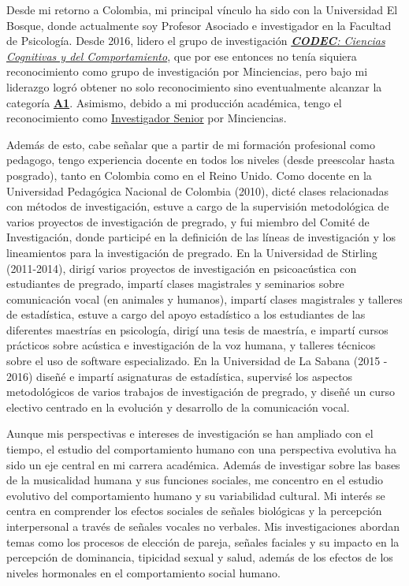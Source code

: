 \documentclass[11pt,a4paper,]{awesome-cv}
\begin{document}
\begin{small}
Desde mi retorno a Colombia, mi principal vínculo ha sido con la Universidad El Bosque, donde actualmente soy Profesor Asociado e investigador en la Facultad de Psicología. Desde 2016, lidero el grupo de investigación \href{https://investigaciones.unbosque.edu.co/codec}{\textit{\textbf{CODEC}: Ciencias Cognitivas y del Comportamiento}}, que por ese entonces no tenía siquiera reconocimiento como grupo de investigación por Minciencias, pero bajo mi liderazgo logró obtener no solo reconocimiento sino eventualmente alcanzar la categoría \textbf{\href{https://scienti.minciencias.gov.co/gruplac/jsp/visualiza/visualizagr.jsp?nro=00000000001446}{A1}}. Asimismo, debido a mi producción académica, tengo el reconocimiento como \href{https://scienti.minciencias.gov.co/cvlac/visualizador/generarCurriculoCv.do?cod_rh=0001348945}{Investigador Senior} por Minciencias.

Además de esto, cabe señalar que a partir de mi formación profesional como pedagogo, tengo experiencia docente en todos los niveles (desde preescolar hasta posgrado), tanto en Colombia como en el Reino Unido. Como docente en la Universidad Pedagógica Nacional de Colombia (2010), dicté clases relacionadas con métodos de investigación, estuve a cargo de la supervisión metodológica de varios proyectos de investigación de pregrado, y fui miembro del Comité de Investigación, donde participé en la definición de las líneas de investigación y los lineamientos para la investigación de pregrado. En la Universidad de Stirling (2011-2014), dirigí varios proyectos de investigación en psicoacústica con estudiantes de pregrado, impartí clases magistrales y seminarios sobre comunicación vocal (en animales y humanos), impartí clases magistrales y talleres de estadística, estuve a cargo del apoyo estadístico a los estudiantes de las diferentes maestrías en psicología, dirigí una tesis de maestría, e impartí cursos prácticos sobre acústica e investigación de la voz humana, y talleres técnicos sobre el uso de software especializado. En la Universidad de La Sabana (2015 - 2016) diseñé e impartí asignaturas de estadística, supervisé los aspectos metodológicos de varios trabajos de investigación de pregrado, y diseñé un curso electivo centrado en la evolución y desarrollo de la comunicación vocal.

Aunque mis perspectivas e intereses de investigación se han ampliado con el tiempo, el estudio del comportamiento humano con una perspectiva evolutiva ha sido un eje central en mi carrera académica. Además de investigar sobre las bases de la musicalidad humana y sus funciones sociales, me concentro en el estudio evolutivo del comportamiento humano y su variabilidad cultural. Mi interés se centra en comprender los efectos sociales de señales biológicas y la percepción interpersonal a través de señales vocales no verbales. Mis investigaciones abordan temas como los procesos de elección de pareja, señales faciales y su impacto en la percepción de dominancia, tipicidad sexual y salud, además de los efectos de los niveles hormonales en el comportamiento social humano.


\end{small}
\end{document}
